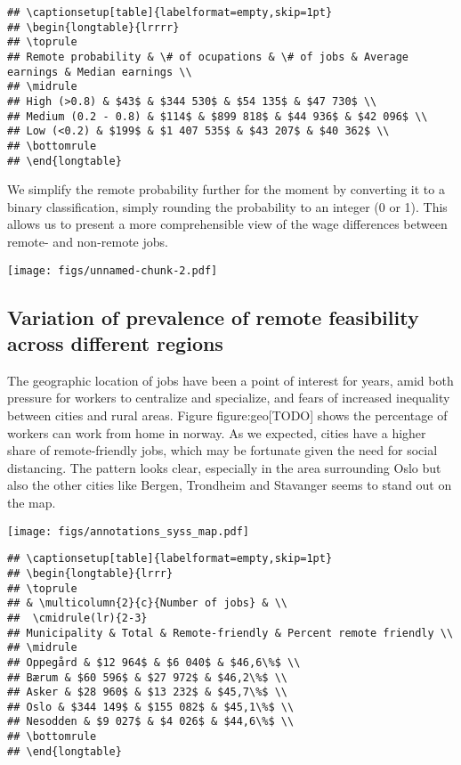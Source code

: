 \documentclass[11pt,]{article}
\begin{document}
\begin{verbatim}
## \captionsetup[table]{labelformat=empty,skip=1pt}
## \begin{longtable}{lrrrr}
## \toprule
## Remote probability & \# of ocupations & \# of jobs & Average earnings & Median earnings \\ 
## \midrule
## High (>0.8) & $43$ & $344 530$ & $54 135$ & $47 730$ \\ 
## Medium (0.2 - 0.8) & $114$ & $899 818$ & $44 936$ & $42 096$ \\ 
## Low (<0.2) & $199$ & $1 407 535$ & $43 207$ & $40 362$ \\ 
## \bottomrule
## \end{longtable}
\end{verbatim}

We simplify the remote probability further for the moment by converting
it to a binary classification, simply rounding the probability to an
integer (0 or 1). This allows us to present a more comprehensible view
of the wage differences between remote- and non-remote jobs.

\texttt{[image: figs/unnamed-chunk-2.pdf]}

\hypertarget{variation-of-prevalence-of-remote-feasibility-across-different-regions}{%
\subsection{Variation of prevalence of remote feasibility across
different
regions}\label{variation-of-prevalence-of-remote-feasibility-across-different-regions}}

The geographic location of jobs have been a point of interest for years,
amid both pressure for workers to centralize and specialize, and fears
of increased inequality between cities and rural areas. Figure
figure:geo{[}TODO{]} shows the percentage of workers can work from home
in norway. As we expected, cities have a higher share of remote-friendly
jobs, which may be fortunate given the need for social distancing. The
pattern looks clear, especially in the area surrounding Oslo but also
the other cities like Bergen, Trondheim and Stavanger seems to stand out
on the map.

\texttt{[image: figs/annotations\_syss\_map.pdf]}

\begin{verbatim}
## \captionsetup[table]{labelformat=empty,skip=1pt}
## \begin{longtable}{lrrr}
## \toprule
## & \multicolumn{2}{c}{Number of jobs} & \\ 
##  \cmidrule(lr){2-3}
## Municipality & Total & Remote-friendly & Percent remote friendly \\ 
## \midrule
## Oppegård & $12 964$ & $6 040$ & $46,6\%$ \\ 
## Bærum & $60 596$ & $27 972$ & $46,2\%$ \\ 
## Asker & $28 960$ & $13 232$ & $45,7\%$ \\ 
## Oslo & $344 149$ & $155 082$ & $45,1\%$ \\ 
## Nesodden & $9 027$ & $4 026$ & $44,6\%$ \\ 
## \bottomrule
## \end{longtable}
\end{verbatim}
\end{document}
